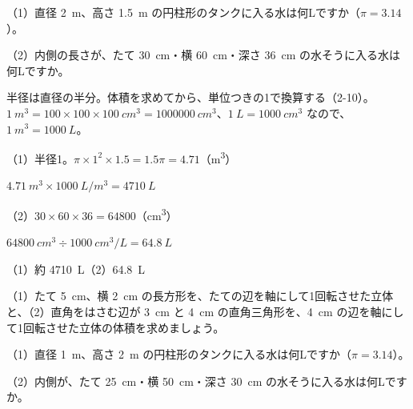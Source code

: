 \begin{reidai}[タンクや水そうの容量を L で]
（1）直径 \qty{2}{m}、高さ \qty{1.5}{m} の円柱形のタンクに入る水は何Lですか（$\pi=3.14$）。\par
（2）内側の長さが、たて \qty{30}{cm}・横 \qty{60}{cm}・深さ \qty{36}{cm} の水そうに入る水は何Lですか。\par
\kangaekata 半径は直径の半分。体積を求めてから、単位つきの1で換算する（2-10）。$\qty{1}{m^3}=100\times100\times\qty{100}{cm^3}=\qty{1000000}{cm^3}$、$\qty{1}{L}=\qty{1000}{cm^3}$ なので、$\qty{1}{m^3}=\qty{1000}{L}$。\par
\shiki（1）半径1。$\pi\times1^2\times1.5=1.5\pi=4.71$（\unit{m^3}）\par
\hspace*{4.6\zw}$\qty{4.71}{m^3}\times\qty{1000}{L/m^3}=\qty{4710}{L}$\par
\hspace*{2.6\zw}（2）$30\times60\times36=\num{64800}$（\unit{cm^3}）\par
\hspace*{4.6\zw}$\qty{64800}{cm^3}\div\qty{1000}{cm^3/L}=\qty{64.8}{L}$\par
\kotae（1）約 \qty{4710}{L}\quad（2）\qty{64.8}{L}
\end{reidai}

\noindent\begin{minipage}[t]{0.485\linewidth}\vspace{0pt}\raggedright
\begin{jibun}\raggedright
（1）たて \qty{5}{cm}、横 \qty{2}{cm} の長方形を、たての辺を軸にして1回転させた立体と、（2）直角をはさむ辺が \qty{3}{cm} と \qty{4}{cm} の直角三角形を、\qty{4}{cm} の辺を軸にして1回転させた立体の体積を求めましょう。
\end{jibun}
\end{minipage}\hfill
\begin{minipage}[t]{0.485\linewidth}\vspace{0pt}\raggedright
\begin{jibun}\raggedright
（1）直径 \qty{1}{m}、高さ \qty{2}{m} の円柱形のタンクに入る水は何Lですか（$\pi=3.14$）。\par（2）内側が、たて \qty{25}{cm}・横 \qty{50}{cm}・深さ \qty{30}{cm} の水そうに入る水は何Lですか。
\end{jibun}
\end{minipage}

